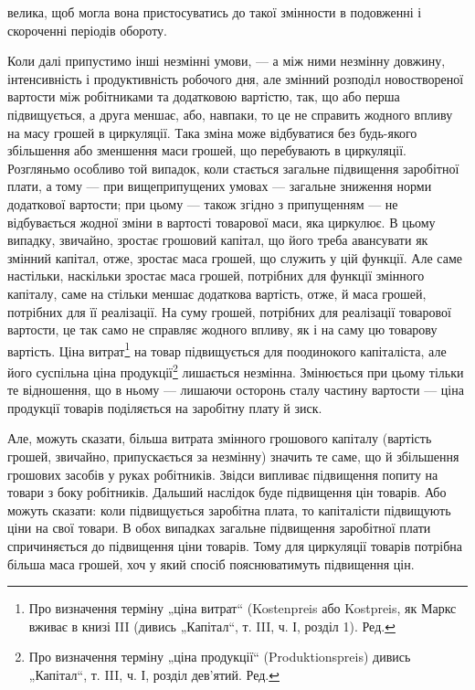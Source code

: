 \parcont{}  %
велика, щоб могла вона пристосуватись до такої змінности в подовженні
і скороченні періодів обороту.

Коли далі припустимо інші незмінні умови, — а між ними незмінну
довжину, інтенсивність і продуктивність робочого дня, але змінний
розподіл новоствореної вартости між робітниками та додатковою
вартістю, так, що або перша підвищується, а друга меншає,
або, навпаки, то це не справить жодного впливу на масу грошей в
циркуляції. Така зміна може відбуватися без будь-якого збільшення або
зменшення маси грошей, що перебувають в циркуляції. Розгляньмо особливо
той випадок, коли стається загальне підвищення заробітної плати,
а тому — при вищеприпущених умовах — загальне зниження норми додаткової
вартости; при цьому — також згідно з припущенням — не відбувається
жодної зміни в вартості товарової маси, яка циркулює. В цьому
випадку, звичайно, зростає грошовий капітал, що його треба авансувати
як змінний капітал, отже, зростає маса грошей, що служить у цій
функції. Але саме настільки, наскільки зростає маса грошей, потрібних
для функції змінного капіталу, саме на стільки меншає додаткова вартість,
отже, й маса грошей, потрібних для її реалізації. На суму грошей,
потрібних для реалізації товарової вартости, це так само не справляє
жодного впливу, як і на саму цю товарову вартість. Ціна витрат\footnote*{
Про визначення терміну „ціна витрат“ (Kostenpreis або Kostpreis, як Маркс
вживає в книзі III (дивись „Капітал“, т. III, ч. І, розділ 1). Ред.
} на
товар підвищується для поодинокого капіталіста, але його суспільна ціна
продукції\footnote*{
Про визначення терміну „ціна продукції“ (Produktionspreis) дивись „Капітал“,
т. III, ч. І, розділ дев’ятий. Ред.
} лишається незмінна. Змінюється при цьому тільки те відношення,
що в ньому — лишаючи осторонь сталу частину вартости — ціна
продукції товарів поділяється на заробітну плату й зиск.

Але, можуть сказати, більша витрата змінного грошового капіталу
(вартість грошей, звичайно, припускається за незмінну) значить те саме,
що й збільшення грошових засобів у руках робітників. Звідси випливає
підвищення попиту на товари з боку робітників. Дальший наслідок буде
підвищення цін товарів. Або можуть сказати: коли підвищується заробітна
плата, то капіталісти підвищують ціни на свої товари. В обох випадках
загальне підвищення заробітної плати спричиняється до підвищення ціни
товарів. Тому для циркуляції товарів потрібна більша маса грошей, хоч
у який спосіб пояснюватимуть підвищення цін.

